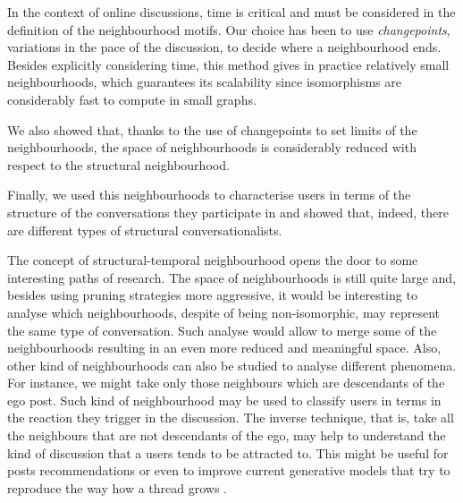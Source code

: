 \documentclass[conference]{IEEEtran}
\begin{document}
In the context of online discussions, time is critical and must be considered in the definition of the neighbourhood motifs. Our choice has been to use \textit{changepoints}, variations in the pace of the discussion, to decide where a neighbourhood ends. Besides explicitly considering time, this method gives in practice relatively small neighbourhoods, which guarantees its scalability since isomorphisms are considerably fast to compute in small graphs.  

We also showed that, thanks to the use of changepoints to set limits of the neighbourhoods, the space of neighbourhoods is considerably reduced with respect to the structural neighbourhood. 

Finally, we used this neighbourhoods to characterise users in terms of the structure of the conversations they participate in and showed that, indeed, there are different types of structural conversationalists.

The concept of structural-temporal neighbourhood opens the door to some interesting paths of research.  The space of neighbourhoods is still quite large and, besides using pruning strategies more aggressive, it would be interesting to analyse which neighbourhoods, despite of being non-isomorphic, may represent the same type of conversation. Such analyse would allow to merge some of the neighbourhoods resulting in an even more reduced and meaningful space. Also, other kind of neighbourhoods can also be studied to analyse different phenomena. For instance, we might take only those neighbours which are descendants of the ego post. Such kind of neighbourhood may be used to classify users in terms in the reaction they trigger in the discussion. The inverse technique, that is, take all the neighbours that are not descendants of the ego, may help to understand the kind of discussion that a users tends to be attracted to. This might be useful for posts recommendations or even to improve current generative models that try to reproduce the way how a thread grows \cite{Gomez2012, Kumar2010}.
\end{document}
